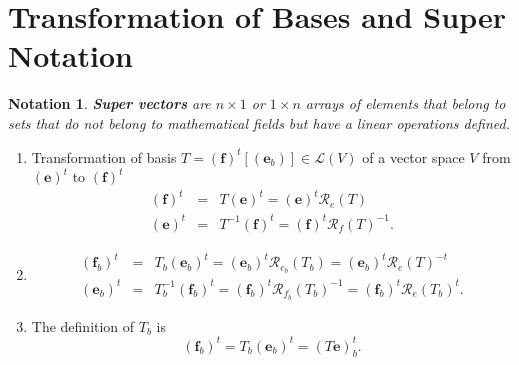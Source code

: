 \documentclass[aps,preprint]{revtex4}
\newtheorem{notation}[theorem]{Notation}
\begin{document}
\section{Transformation of Bases and Super Notation}

\begin{notation}
\textbf{Super vectors} are $n\times 1$ or $1\times n$ arrays of elements
that belong to sets that do not belong to mathematical fields but have a
linear operations defined.
\end{notation}

\begin{enumerate}
\item Transformation of basis $T=\left( \mathbf{f}\right) ^{t}\left[ \left( 
\mathbf{e}_{b}\right) \right] \in \mathcal{L}\left( V\right) $ of a vector
space $V$ from $\left( \mathbf{e}\right) ^{t}$ to $\left( \mathbf{f}\right)
^{t}$ 
\begin{eqnarray}
\left( \mathbf{f}\right) ^{t} &=&T\left( \mathbf{e}\right) ^{t}=\left( 
\mathbf{e}\right) ^{t}\mathcal{R}_{e}\left( T\right) \\
\left( \mathbf{e}\right) ^{t} &=&T^{-1}\left( \mathbf{f}\right) ^{t}=\left( 
\mathbf{f}\right) ^{t}\mathcal{R}_{f}\left( T\right) ^{-1}.
\end{eqnarray}

\item 
\begin{eqnarray}
\left( \mathbf{f}_{b}\right) ^{t} &=&T_{b}\left( \mathbf{e}_{b}\right)
^{t}=\left( \mathbf{e}_{b}\right) ^{t}\mathcal{R}_{e_{b}}\left( T_{b}\right)
=\left( \mathbf{e}_{b}\right) ^{t}\mathcal{R}_{e}\left( T\right) ^{-t} \\
\left( \mathbf{e}_{b}\right) ^{t} &=&T_{b}^{-1}\left( \mathbf{f}_{b}\right)
^{t}=\left( \mathbf{f}_{b}\right) ^{t}\mathcal{R}_{f_{b}}\left( T_{b}\right)
^{-1}=\left( \mathbf{f}_{b}\right) ^{t}\mathcal{R}_{e}\left( T_{b}\right)
^{t}.
\end{eqnarray}

\item The definition of $T_{b}$ is 
\begin{equation}
\left( \mathbf{f}_{b}\right) ^{t}=T_{b}\left( \mathbf{e}_{b}\right)
^{t}=\left( T\mathbf{e}\right) _{b}^{t}.
\end{equation}


\end{enumerate}
\end{document}
